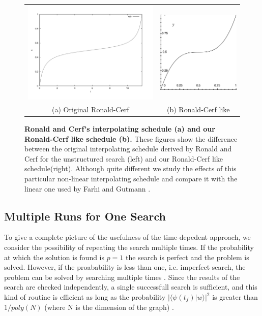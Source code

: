         \begin{figure}[ht]
          \centering
          \begin{tabular}{cc}
            \includegraphics[width=75mm]{./figures/interpolating_schedules/cerf} &   \includegraphics[width=45mm]{./figures/interpolating_schedules/our_cerf} \\
          (a) Original Ronald-Cerf & (b) Ronald-Cerf like\\[6pt]
          \end{tabular}
          \caption[Ronald and Cerf's interpolating schedules for the unstructured search and our non-linear schedule]{\textbf{Ronald and Cerf's interpolating schedule (a) and our Ronald-Cerf like schedule (b).} These figures show the difference between the original interpolating schedule derived by Ronald and Cerf for the unstructured search (left) and our Ronald-Cerf like schedule(right). Although quite different we study the effects of this particular non-linear interpolating schedule and compare it with the linear one used by Farhi and Gutmann \cite{Farhi2000}.}
          \label{cerf}
        \end{figure}

        \subsection{Multiple Runs for One Search}
        To give a complete picture of the usefulness of the time-depedent approach, we consider the possibility of repeating the search multiple times. If the probability at which the solution is found is $p=1$ the search is perfect and the problem is solved. However, if the proabability is less than one, i.e. imperfect search, the problem can be solved by searching multiple times . Since the results of the search are checked independently, a single successfull search is sufficient, and this kind of routine is efficient as long as the probability $\big|\langle\psi(t_f)| w\rangle\big|^2$ is greater than $1/poly(N)$ (where N is the dimension of the graph) \cite{Morley2018}.

